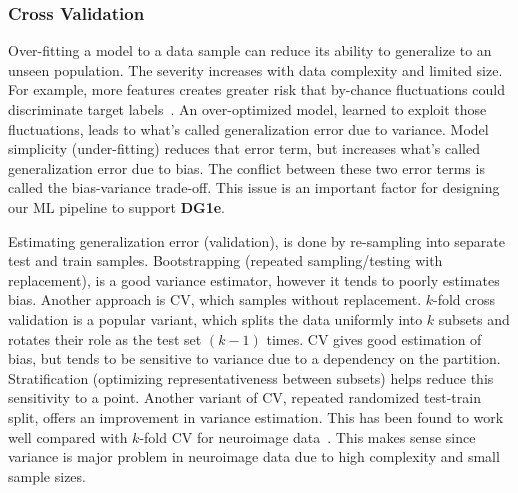 \subsubsection{Cross Validation}
\label{sec:CrossValidation}


\noindent Over-fitting a model to a data sample can reduce its ability to generalize to an unseen population. The severity increases with data complexity and limited size. For example, more features creates greater risk that by-chance fluctuations could discriminate target labels~\cite{krawczuk2016feature}. An over-optimized model, learned to exploit those fluctuations, leads to what's called generalization error due to variance. Model simplicity (under-fitting) reduces that error term, but increases what's called generalization error due to bias.
The conflict between these two error terms is called the bias-variance trade-off. This issue is an important factor for designing our ML pipeline to support \textbf{DG1e}.

Estimating generalization error (validation), is done by re-sampling into separate test and train samples. Bootstrapping (repeated sampling/testing with replacement), is a good variance estimator, however it tends to poorly estimates bias. Another approach is CV, which samples without replacement. $k$-fold cross validation is a popular variant, which splits the data uniformly into $k$ subsets and rotates their role as the test set $(k-1)$ times. CV gives good estimation of bias, but tends to be sensitive to variance due to a dependency on the partition. Stratification (optimizing representativeness between subsets) helps reduce this sensitivity to a point. Another variant of CV, repeated randomized test-train split, offers an improvement in variance estimation. This has been found to work well compared with $k$-fold CV for neuroimage data~\cite{varoquaux2017assessing}. This makes sense since variance is major problem in neuroimage data due to high complexity and small sample sizes. 

